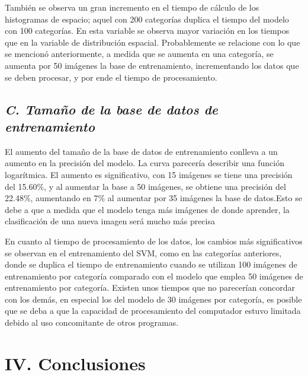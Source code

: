 \documentclass[10pt,twocolumn,letterpaper]{article}
\begin{document}
También se observa un gran incremento en el tiempo de cálculo de los histogramas de espacio; aquel con 200 categorías duplica el tiempo del modelo con 100 categorías. En esta variable se observa mayor variación en los tiempos que en la variable de distribución espacial. Probablemente se relacione con lo que se mencionó anteriormente, a medida que se aumenta en una categoría, se aumenta por 50 imágenes la base de entrenamiento, incrementando los datos que se deben procesar, y por ende el tiempo de procesamiento. 

\subsection{ \textit{C. Tamaño de la base de datos de entrenamiento}}

El aumento del tamaño de la base de datos de entrenamiento conlleva a un aumento en la precisión del modelo. La curva parecería describir una función logarítmica. El aumento es significativo, con 15 imágenes se tiene una precisión del 15.60\%, y al aumentar la base a 50 imágenes, se obtiene una precisión del 22.48\%, aumentando en 7\% al aumentar por 35 imágenes la base de datos.Esto se debe a que a medida que el modelo tenga más imágenes de donde aprender, la clasificación de una nueva imagen será mucho más precisa 

En cuanto al tiempo de procesamiento de los datos, los cambios más significativos se observan en el entrenamiento del SVM, como en las categorías anteriores, donde se duplica el tiempo de entrenamiento cuando se utilizan 100 imágenes de entrenamiento por categoría comparado con el modelo que emplea 50 imágenes de entrenamiento por categoría. Existen unos tiempos que no parecerían concordar con los demás, en especial los del modelo de 30 imágenes por categoría, es posible que se deba a que la capacidad de procesamiento del computador estuvo limitada debido al uso concomitante de otros programas. 

\section{\textbf{IV. Conclusiones}}
\end{document}
